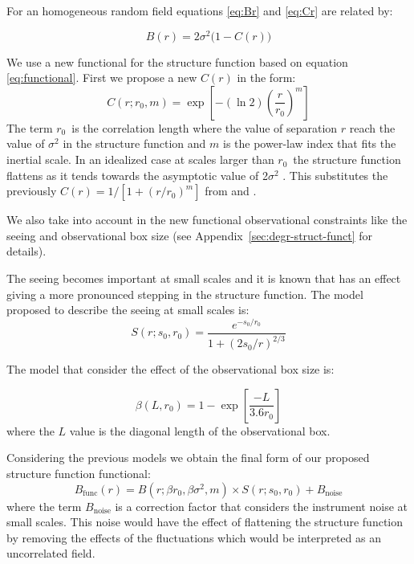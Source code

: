 \documentclass[fleqn,usenatbib, useAMS, a4paper]{mnras}
\begin{document}
For an homogeneous random field equations \ref{eq:Br} and \ref{eq:Cr} are related by:

\begin{equation}\label{eq:functional}
B(r) = 2\sigma^2 \bigl( 1 - C(r) \bigr)
\end{equation}

We use a new functional for the structure function based on equation \ref{eq:functional}. 
First we propose a new \(C(r)\) in the form:
%
\begin{equation}\label{eq:new-correlation-form}
  C(r; r_0, m) = \exp \left[ -(\ln 2) \left( \frac{r}{r_0} \right)^m \right]
\end{equation}
%
The term \(r_{0}\)\ is the correlation length where the value of separation \(r\) reach the value of \(\sigma^2\) in the structure function and $m$ is the power-law index that fits the inertial scale.
In an idealized case at scales larger than \(r_{0}\)\ the structure function flattens as it tends towards the asymptotic value of 2\(\sigma^2\) \citep{arthur2016turbulence}.
This substitutes the previously \(C(r) = 1/[1+(r/r_{0})^{m}]\) from \citet{1966igd..book.....K} and
\citet{1984ApJ...277..556S}.

We also take into account in the new functional observational constraints like the seeing and observational box size (see Appendix~\ref{sec:degr-struct-funct} for details). 

The seeing becomes important at small scales and it is known that has an effect giving a more pronounced stepping in the structure function.
The model proposed to describe the seeing at small scales is:
%
\begin{equation}\label{eq:ffs}
  S(r; s_0, r_0) = \frac{
    e^{-s_0 / r_0}
  }{
    1+(2s_0 / r)^{2 / 3}
  }
\end{equation}

The model that consider the effect of the observational box size is:

\begin{equation}\label{eq:ffb}
  \beta(L,r_0) = 1 - \exp \left[ \frac{-L} {3.6 r_0} \right] 
\end{equation}
%
where the \(L\) value is the diagonal length of the observational box.

Considering the previous models we obtain the final form of our proposed structure function functional:
%
\begin{equation}\label{eq:sf-functional}
B_{\text{func}}(r) = B(r; \beta r_0, \beta \sigma^2,m) \times S(r; s_0, r_0) + B_{\text{noise}}
\end{equation}
%
where the term \( B_{\text{noise}}\) is a correction factor that considers the instrument noise at small scales.
This noise would have the effect of flattening the structure function by removing the effects of the fluctuations which would be interpreted as an uncorrelated field. 
\end{document}
